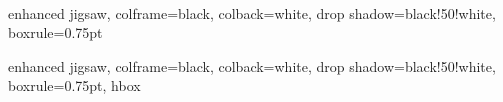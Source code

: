 

\hypersetup{
    colorlinks=true,
    linkcolor=darkgray,
    citecolor=teal,
    filecolor=PineGreen,      
    urlcolor=BurntOrange,
    pdfpagemode=FullScreen,
}



\makeatletter
\renewcommand{\paragraph}{%
  \@startsection{paragraph}{4}%
  {\z@}{0.375\baselineskip \@plus 1ex \@minus .2ex}{-0.75em}%
  {\normalfont\normalsize\bfseries}%
}
\makeatother



{
  enhanced jigsaw,
  colframe=black,
  colback=white,
  drop shadow=black!50!white,
  boxrule=0.75pt
}

{
  enhanced jigsaw,
  colframe=black,
  colback=white,
  drop shadow=black!50!white,
  boxrule=0.75pt,
  hbox
}


\title{\Large\textcolor{\thetitlecolor}{\textsf{\textbf{\themaintitle}}} \\[1em]
\begin{normalsize}
    \textcolor{\thetitlecolor}{\thesubtitle}
\end{normalsize}\\[1.5em] \begin{tcolorbox}[height=0.95cm, hbox, colframe=white, colback=fistagray!10, halign=center, valign=top, boxrule=0.75pt, arc=1.5mm, auto outer arc]\begin{large}\textcolor{\thetitlecolor}{\textit{\thedocumenttype}}\end{large}\end{tcolorbox}\vspace{-0.75em}}

\newcommand{\secondarycolor}[1]{\text{\textcolor{fistagray}{#1}}}

